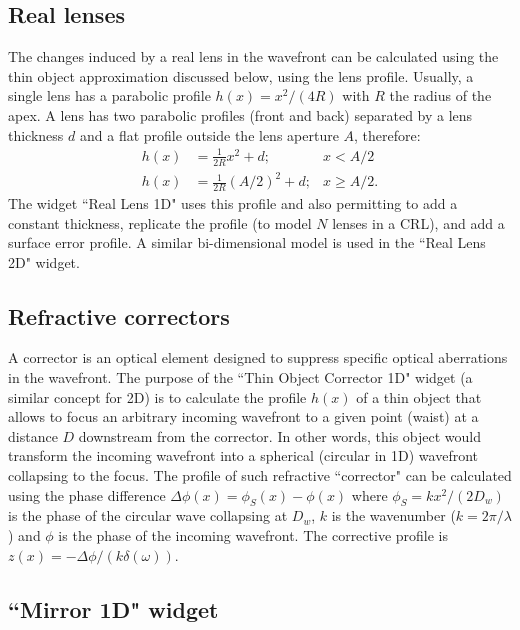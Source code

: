 \documentclass{iopconfser}
\begin{document}
\subsection{Real lenses}
The changes induced by a real lens in the wavefront can be calculated using the thin object approximation discussed below, using the lens profile. Usually, a single lens has a parabolic profile $h(x)=x^2/(4R)$ with $R$ the radius of the apex. A lens has two parabolic profiles (front and back) separated by a lens thickness $d$ and a flat profile outside the lens aperture $A$, therefore:
\begin{align}
    h(x) &= \frac{1}{2R} x^2 + d; & x < A/2\\ \nonumber
    h(x) &= \frac{1}{2R} (A/2)^2 + d; & x \ge A/2.
\end{align}
The widget ``Real Lens 1D" uses this profile and also permitting to add a constant thickness,  replicate the profile (to model $N$ lenses in a CRL), and add a surface error profile. A similar bi-dimensional model is used in the ``Real Lens 2D" widget.  

\subsection{Refractive correctors}
\label{sec:refractorCorrector}

A corrector is an optical element designed to suppress specific optical aberrations in the wavefront. The purpose of the  ``Thin Object Corrector 1D" widget (a similar concept for 2D)  is to calculate the profile $h(x)$ of a thin object that allows to focus an arbitrary incoming wavefront to a given point (waist) at a distance $D$ downstream from the corrector. In other words, this object would transform the incoming wavefront into a spherical (circular in 1D) wavefront collapsing to the focus. The profile of such refractive ``corrector"  can be calculated using the phase difference $\Delta\phi(x)=\phi_S(x)-\phi(x)$ where $\phi_S=k x^2 / (2 D_w)$ is the phase of the circular wave collapsing at $D_w$, $k$ is the wavenumber ($k=2\pi/\lambda$) and $\phi$ is the phase of the incoming wavefront. The corrective profile is $z(x)=-\Delta\phi/(k \delta(\omega))$.


\subsection{``Mirror 1D" widget}
\label{sec:mirror1D}
\end{document}
